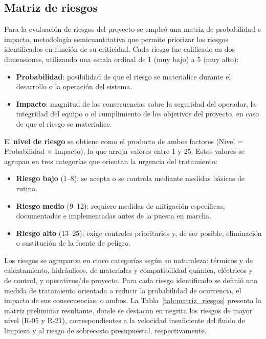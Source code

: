 \subsection{Matriz de riesgos}
Para la evaluación de riesgos del proyecto se empleó una matriz de probabilidad e impacto, 
metodología semicuantitativa que permite priorizar los riesgos identificados en función de 
su criticidad. Cada riesgo fue calificado en dos dimensiones, utilizando una escala ordinal 
de 1 (muy bajo) a 5 (muy alto):

\begin{itemize}
    \item \textbf{Probabilidad}: posibilidad de que el riesgo se materialice durante el 
    desarrollo o la operación del sistema.
    \item \textbf{Impacto}: magnitud de las consecuencias sobre la seguridad del operador, 
    la integridad del equipo o el cumplimiento de los objetivos del proyecto, en caso de 
    que el riesgo se materialice.
\end{itemize}

El \textbf{nivel de riesgo} se obtiene como el producto de ambos factores 
(Nivel = Probabilidad $\times$ Impacto), lo que arroja valores entre 1 y 25. Estos valores 
se agrupan en tres categorías que orientan la urgencia del tratamiento:

\begin{itemize}
    \item \textbf{Riesgo bajo} (1--8): se acepta o se controla mediante medidas básicas 
    de rutina.
    \item \textbf{Riesgo medio} (9--12): requiere medidas de mitigación específicas, 
    documentadas e implementadas antes de la puesta en marcha.
    \item \textbf{Riesgo alto} (13--25): exige controles prioritarios y, de ser posible, 
    eliminación o sustitución de la fuente de peligro.
\end{itemize}

Los riesgos se agruparon en cinco categorías según su naturaleza: térmicos y de 
calentamiento, hidráulicos, de materiales y compatibilidad química, eléctricos y de 
control, y operativos/de proyecto. Para cada riesgo identificado se definió una medida de 
tratamiento orientada a reducir la probabilidad de ocurrencia, el impacto de sus 
consecuencias, o ambos. La Tabla~\ref{tab:matriz_riesgos} presenta la matriz preliminar 
resultante, donde se destacan en negrita los riesgos de mayor nivel (R-05 y R-21), 
correspondientes a la velocidad insuficiente del fluido de limpieza y al riesgo de 
sobrecosto presupuestal, respectivamente.


